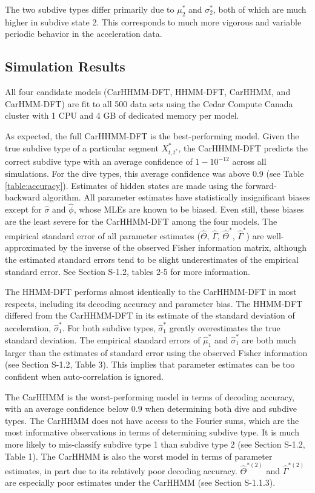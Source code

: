 The two subdive types differ primarily due to $\mu_2^*$ and $\sigma_2^*$, both of which are much higher in subdive state 2. This corresponds to much more vigorous and variable periodic behavior in the acceleration data.

\subsection{Simulation Results}

All four candidate models (CarHHMM-DFT, HHMM-DFT, CarHHMM, and CarHMM-DFT) are fit to all 500 data sets using the Cedar Compute Canada cluster with 1 CPU and 4 GB of dedicated memory per model.

As expected, the full CarHHMM-DFT is the best-performing model. Given the true subdive type of a particular segment $X^*_{t,t^*}$, the CarHHMM-DFT predicts the correct subdive type with an average confidence of $1 - 10^{-12}$ across all simulations. For the dive types, this average confidence was above 0.9 (see Table \ref{table:accuracy}). Estimates of hidden states are made using the forward-backward algorithm. All parameter estimates have statistically insignificant biases except for $\hat \sigma$ and $\hat \phi$, whose MLEs are known to be biased. Even still, these biases are the least severe for the CarHHMM-DFT among the four models. The empirical standard error of all parameter estimates ($\hat \Theta$, $\hat \Gamma$, $\hat \Theta^*$, $\hat \Gamma^*$) are well-approximated by the inverse of the observed Fisher information matrix, although the estimated standard errors tend to be slight underestimates of the empirical standard error. See Section S-1.2, tables 2-5 for more information.

The HHMM-DFT performs almost identically to the CarHHMM-DFT in most respects, including its decoding accuracy and parameter bias. The HHMM-DFT differed from the CarHHMM-DFT in its estimate of the standard deviation of acceleration, $\hat \sigma_1^*$. For both subdive types, $\hat \sigma_1^*$ greatly overestimates the true standard deviation. The empirical standard errors of $\hat \mu_1^*$ and $\hat \sigma_1^*$ are both much larger than the estimates of standard error using the observed Fisher information (see Section S-1.2, Table 3). This implies that parameter estimates can be too confident when auto-correlation is ignored.

The CarHHMM is the worst-performing model in terms of decoding accuracy, with an average confidence below $0.9$ when determining both dive and subdive types. The CarHHMM does not have access to the Fourier sums, which are the most informative observations in terms of determining subdive type. It is much more likely to mis-classify subdive type 1 than subdive type 2 (see Section S-1.2, Table 1). The CarHHMM is also the worst model in terms of parameter estimates, in part due to its relatively poor decoding accuracy. $\hat \Theta^{*(2)}$ and $\hat \Gamma^{*(2)}$ are especially poor estimates under the CarHHMM (see Section S-1.1.3).

